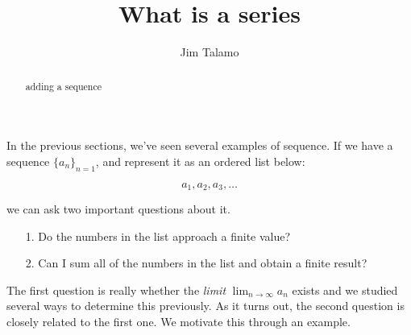 \documentclass{ximera}
\author{Jim Talamo}
\title[Dig-In:]{What is a series}
\begin{document}
\begin{abstract}
adding a sequence
\end{abstract}
\maketitle

In the previous sections, we've seen several examples of sequence.  If we have a sequence $\{a_n\}_{n=1}$, and represent it as an ordered list below: 

\[
a_1, a_2, a_3 , \ldots
\]

we can ask two important questions about it.

\begin{itemize}
\item[1.] Do the numbers in the list approach a finite value?
\item[2.] Can I sum all of the numbers in the list and obtain a finite result?
\end{itemize}

The first question is really whether the \emph{limit} $\lim_{n \to \infty} a_n$ exists and we studied several ways to determine this previously.  As it turns out, the second question is closely related to the first one.  We motivate this through an example.
\end{document}
